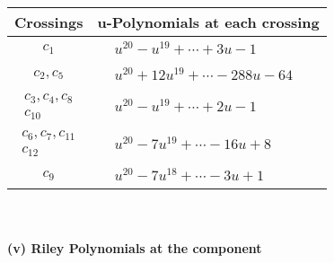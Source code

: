 \documentclass[1p]{elsarticle_modified}
\theoremstyle{definition}
\begin{document}
\begin{tabular}{m{50pt}|m{274pt}}
Crossings & \hspace{64pt}u-Polynomials at each crossing \\
\hline $$\begin{aligned}c_{1}\end{aligned}$$&$\begin{aligned}
&u^{20}- u^{19}+\cdots+3 u-1
\end{aligned}$\\
\hline $$\begin{aligned}c_{2},c_{5}\end{aligned}$$&$\begin{aligned}
&u^{20}+12 u^{19}+\cdots-288 u-64
\end{aligned}$\\
\hline $$\begin{aligned}c_{3},c_{4},c_{8}\\c_{10}\end{aligned}$$&$\begin{aligned}
&u^{20}- u^{19}+\cdots+2 u-1
\end{aligned}$\\
\hline $$\begin{aligned}c_{6},c_{7},c_{11}\\c_{12}\end{aligned}$$&$\begin{aligned}
&u^{20}-7 u^{19}+\cdots-16 u+8
\end{aligned}$\\
\hline $$\begin{aligned}c_{9}\end{aligned}$$&$\begin{aligned}
&u^{20}-7 u^{18}+\cdots-3 u+1
\end{aligned}$\\
\hline
\end{tabular}\\~\\
\newpage\renewcommand{\arraystretch}{1}
\flushleft \textbf{(v) Riley Polynomials at the component}\newline \\
\end{document}
